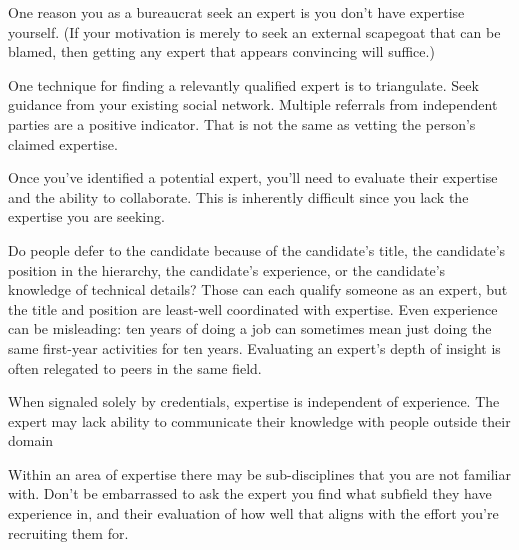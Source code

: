 One reason you as a bureaucrat seek an expert is you don't have expertise yourself. (If your motivation is merely to seek an external scapegoat that can be blamed, then getting any expert that appears convincing will suffice.)

One technique for finding a relevantly qualified expert is to triangulate. 
Seek guidance from your existing social network. Multiple referrals from independent parties are a positive indicator. That is not the same as vetting the person's claimed expertise.

Once you've identified a potential expert, you'll need to evaluate their expertise and the ability to collaborate. This is inherently difficult since you lack the expertise you are seeking.

Do people defer to the candidate because of the candidate's title, the candidate's position in the hierarchy, the candidate's experience, or the candidate's knowledge of technical details? Those can each qualify someone as an expert, but the title and position are least-well coordinated with expertise. Even experience can be misleading: ten years of doing a job can sometimes mean just doing the same first-year activities for ten years. %
Evaluating an expert's depth of insight is often relegated to peers in the same field. 

 

When signaled solely by credentials, expertise is independent of experience. The expert may lack ability to communicate their knowledge with people outside their domain

Within an area of expertise there may be sub-disciplines that you are not familiar with. Don't be embarrassed to ask the expert you find what subfield they have experience in, and their evaluation of how well that aligns with the effort you're recruiting them for.



